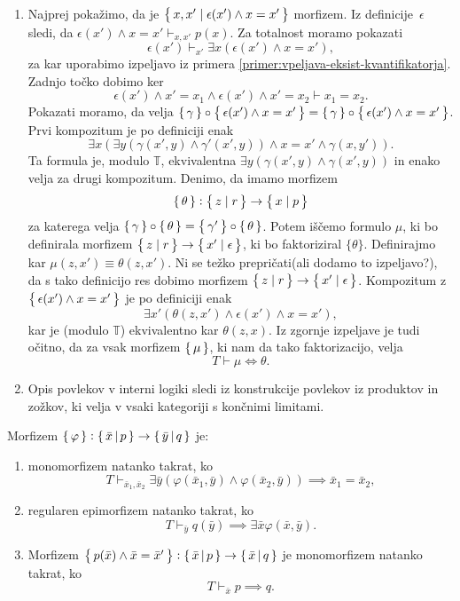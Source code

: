 \documentclass[../kategoricna_logika.tex]{subfiles}
\begin{document}
\begin{dokaz}
\begin{enumerate}[label=(\roman*)]
  \item Najprej pokažimo, da je
    $\left\lbrace\,x,x' \mid \epsilon(x') \land x = x'\,\right\rbrace$ morfizem.  Iz
    definicije~$\epsilon$ sledi, da
    $\epsilon(x') \land x = x' \vdash_{x,x'} p(x)$.  Za totalnost
    moramo pokazati
\[    \epsilon(x') \vdash_{x'} \exists x (\epsilon(x') \land x=x'),\]
    za kar uporabimo izpeljavo iz primera
    \ref{primer:vpeljava-eksist-kvantifikatorja}.  Zadnjo točko dobimo
    ker
    \[\epsilon(x') \land x'=x_1 \land \epsilon(x') \land x'= x_2 \vdash x_1 =
    x_2.\]
    Pokazati moramo, da velja
    $\left\lbrace\,\gamma\,\right\rbrace \circ \left\lbrace\,\epsilon(x') \land x = x'\,\right\rbrace = \left\lbrace\,\gamma\,\right\rbrace
    \circ \left\lbrace\,\epsilon(x') \land x = x'\,\right\rbrace$.  Prvi kompozitum je po
    definiciji enak
    \[\exists x( \exists y(\gamma(x',y) \land \gamma'(x',y)) \land x =
      x' \land \gamma(x,y')). \]
    Ta formula je, modulo $\mathbb{T}$, ekvivalentna
    $\exists y(\gamma(x',y) \land \gamma(x',y))$ in enako
    velja za drugi kompozitum.  Denimo, da imamo morfizem
    \[\left\lbrace\,\theta\,\right\rbrace : \left\lbrace\,z \mid r\,\right\rbrace \to \left\lbrace\,x \mid p\,\right\rbrace\]
    za katerega velja
    $\left\lbrace\,\gamma\,\right\rbrace \circ \left\lbrace\,\theta\,\right\rbrace = \left\lbrace\,\gamma'\,\right\rbrace \circ
    \left\lbrace\,\theta\,\right\rbrace$.  Potem iščemo formulo $\mu$, ki bo definirala
    morfizem $\left\lbrace\,z \mid r\,\right\rbrace \to \left\lbrace\,x' \mid \epsilon\,\right\rbrace$, ki bo
    faktoriziral $\{ \theta\}$.
    Definirajmo kar $\mu(z,x') \equiv \theta(z,x')$. Ni se težko
    prepričati(ali dodamo to izpeljavo?), da s tako definicijo res
    dobimo morfizem $\left\lbrace\,z \mid r\,\right\rbrace \to \left\lbrace\,x' \mid \epsilon\,\right\rbrace$.
    Kompozitum z $\left\lbrace\,\epsilon(x') \land x = x'\,\right\rbrace$ je po definiciji
    enak
    \[  \exists x' (\theta(z,x') \land \epsilon(x') \land x=x'),\]
    kar je (modulo $\mathbb{T}$) ekvivalentno kar $\theta(z,x)$.  Iz
    zgornje izpeljave je tudi očitno, da za vsak morfizem $\left\lbrace\,\mu\,\right\rbrace$,
    ki nam da tako faktorizacijo, velja
    \[T \vdash \mu \iff \theta.\]

  \item Opis povlekov v interni logiki sledi iz konstrukcije povlekov iz
    produktov in zožkov, ki velja v vsaki kategoriji s končnimi
    limitami.
  \end{enumerate}
\end{dokaz}
\begin{lema}\label{lema:morfizmi-v-sintakticni-kategoriji}
  Morfizem
  $\left\lbrace\,\varphi\,\right\rbrace : \left\lbrace\,\bar{x}\,\middle|\, p\,\right\rbrace \to
  \left\lbrace\,\bar{y}\,\middle|\, q\,\right\rbrace$ je:
  \begin{enumerate}[label=(\roman*)]
  \item monomorfizem natanko takrat, ko
      $$T \vdash_{\bar{x}_1,\bar{x}_2}  \exists \bar{y} \left( \varphi(\bar{x}_1,\bar{y}) \wedge \varphi(\bar{x}_2,\bar{y}) \right) \implies \bar{x}_1 = \bar{x}_2 ,$$
    \item regularen epimorfizem natanko takrat, ko
      $$T \vdash_{\bar{y}} q(\bar{y}) \implies \exists \bar{x} \varphi(\bar{x},\bar{y}).$$
    \item Morfizem
      $\left\lbrace\,p(\bar{x}) \wedge \bar{x} = \bar{x}'\,\right\rbrace :
      \left\lbrace\,\bar{x}\,\middle|\, p \,\right\rbrace \to \left\lbrace\,\bar{x}\,\middle|\, q\,\right\rbrace$ je
      monomorfizem natanko takrat, ko
      $$T \vdash_{\bar{x}} p \implies q.$$
    \end{enumerate}
  \end{lema}
\end{document}
